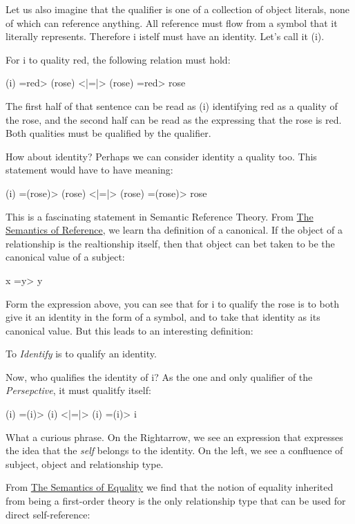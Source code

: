 \documentclass[runningheads]{llncs}
\begin{document}
Let us also imagine that the qualifier is one of a collection of object literals, none of which can reference anything. All reference must flow from a symbol that it literally represents. Therefore i istelf must have an identity. Let's call it (i).

For i to quality red, the following relation must hold:

(i) =red> (rose) <|=|> (rose) =red> rose

The first half of that sentence can be read as (i) identifying red as a quality of the rose, and the second half can be read as the expressing that the rose is red. Both qualities must be qualified by the qualifier. 

How about identity? Perhaps we can consider identity a quality too. This statement would have to have meaning:

(i) =(rose)> (rose) <|=|> (rose) =(rose)> rose

This is a fascinating statement in Semantic Reference Theory. From \href{https://github.com/DNA-Platform/inexplicable-phenomena/formalism/semantic-reference-theory/reference.pdf}{The Semantics of Reference}, we learn tha definition of a canonical. If the object of a relationship is the realtionship itself, then that object can bet taken to be the canonical value of a subject:

x =y> y

Form the expression above, you can see that for i to qualify the rose is to both give it an identity in the form of a symbol, and to take that identity as its canonical value. But this leads to an interesting definition:

\setcounter{definition}{1}
\begin{sdefinition}
	To \emph{Identify} is to qualify an identity.
\end{sdefinition}

Now, who qualifies the identity of i? As the one and only qualifier of the \emph{Persepctive}, it must qualitfy itself:

(i) =(i)> (i) <|=|> (i) =(i)> i

What a curious phrase. On the Rightarrow, we see an expression that expresses the idea that the \emph{self} belongs to the identity. On the left, we see a confluence of subject, object and relationship type. 


From \href{https://github.com/DNA-Platform/inexplicable-phenomena/formalism/semantic-reference-theory/equality.pdf}{The Semantics of Equality} we find that the notion of equality inherited from being a first-order theory is the only relationship type that can be used for direct self-reference:
\end{document}
